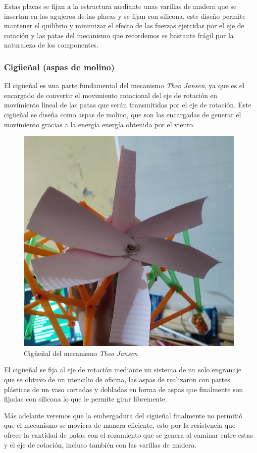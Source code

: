 \begin{multicols}{2}
Estas placas se fijan a la estructura mediante unas varillas de madera que se insertan en los agujeros de las placas y se fijan con silicona, este diseño permite mantener el quilibrio y minimizar el efecto de las fuerzas ejercidas por el eje de rotación y las patas del mecanismo que recordemos es bastante frágil por la naturaleza de los componentes.

\subsubsection{Cigüeñal (aspas de molino)}
El cigüeñal es una parte fundamental del mecanismo \textit{Theo Jansen}, ya que es el encargado de convertir el movimiento rotacional del eje de rotación en movimiento lineal de las patas que serán transmitidas por el eje de rotación. Este cigüeñal se diseña como aspas de molino, que son las encargadas de generar el movimiento gracias a la energía energía obtenida por el viento.

\begin{figure}[H]
  \centering
  \includegraphics[width=0.6\linewidth]{./assets/cigueal.jpeg}
  \caption{Cigüeñal del mecanismo \textit{Theo Jansen}}
  \label{fig:cigueñal}  
\end{figure}


El cigüeñal se fija al eje de rotación mediante un sistema de un solo engranaje que se obtuvo de un utencilio de oficina, las aspas de realizaron con partes plásticas de un vaso cortadas y dobladas en forma de aspas que finalmente son fijadas con silicona lo que le permite girar libremente.

Más adelante veremos que la embergadura del cigüeñal finalmente no permitió que el mecanismo se moviera de manera eficiente, esto por la resistencia que ofrece la cantidad de patas con el rozamiento que se genera al caminar entre estas y el eje de rotación, incluso también con las varillas de madera.


\end{multicols}
